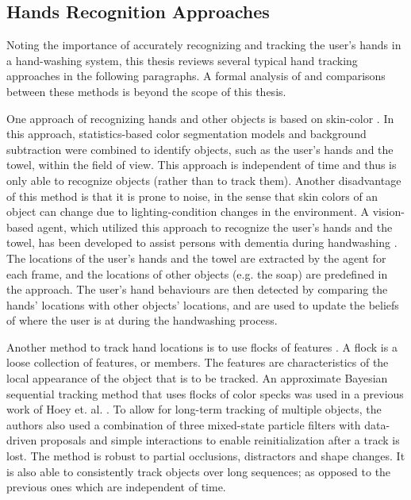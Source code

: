 \subsection{Hands Recognition Approaches}

Noting the importance of accurately recognizing and tracking the user's hands in a hand-washing system, this thesis reviews several typical hand tracking approaches in the following paragraphs. A formal analysis of and comparisons between these methods is beyond the scope of this thesis.

One approach of recognizing hands and other objects is based on skin-color \cite{mihailidis2004use}. In this approach, statistics-based color segmentation models and background subtraction were combined to identify objects, such as the user's hands and the towel, within the field of view. This approach is independent of time and thus is only able to recognize objects (rather than to track them). Another disadvantage of this method is that it is prone to noise, in the sense that skin colors of an object can change due to lighting-condition changes in the environment. A vision-based agent, which utilized this approach to recognize the user's hands and the towel, has been developed to assist persons with dementia during handwashing \cite{boger2005decision}. The locations of the user's hands and the towel are extracted by the agent for each frame, and the locations of other objects (e.g. the soap) are predefined in the approach. The user's hand behaviours are then detected by comparing the hands' locations with other objects' locations, and are used to update the beliefs of where the user is at during the handwashing process. 

Another method to track hand locations is to use flocks of features \cite{hoey2006tracking}. A flock is a loose collection of features, or members. The features are characteristics of the local appearance of the object that is to be tracked. An approximate Bayesian sequential tracking method that uses flocks of color specks was used in a previous work of Hoey et. al. \cite{hoey2006tracking}. To allow for long-term tracking of multiple objects, the authors also used a combination of three mixed-state particle filters \cite{isard1998mixed} with data-driven proposals \cite{okuma2004boosted} and simple interactions to enable reinitialization after a track is lost. The method is robust to partial occlusions, distractors and shape changes. It is also able to consistently track objects over long sequences; as opposed to the previous ones which are independent of time.

